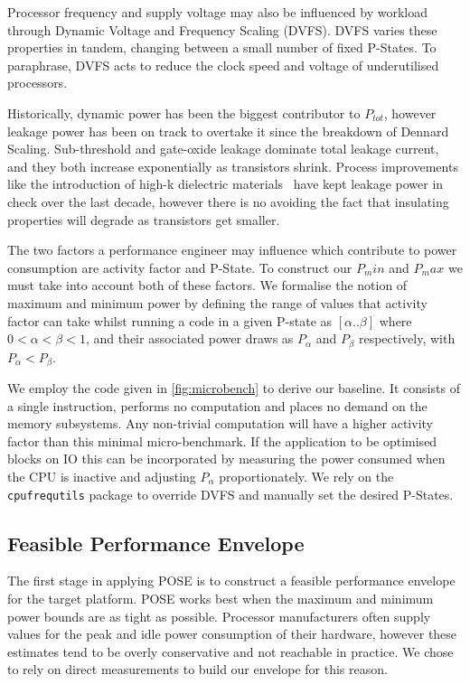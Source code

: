 Processor frequency and supply voltage may also be influenced by workload through Dynamic Voltage and Frequency Scaling (DVFS).
DVFS varies these properties in tandem, changing between a small number of fixed P-States.
To paraphrase, DVFS acts to reduce the clock speed and voltage of underutilised processors.

Historically, dynamic power has been the biggest contributor to $P_{tot}$, however leakage power has been on track to overtake it since the breakdown of Dennard Scaling.  Sub-threshold and gate-oxide leakage dominate total leakage current, and they both increase exponentially as transistors shrink. Process improvements like the introduction of high-k dielectric materials~\cite{jan:2009aa} have kept leakage power in check over the last decade, however there is no avoiding the fact that insulating properties will degrade as transistors get smaller.

The two factors a performance engineer may influence which contribute to power consumption are activity factor and P-State.
To construct our $P_min$ and $P_max$ we must take into account both of these factors.
We formalise the notion of maximum and minimum power by defining the range of values that activity factor can take whilst running a code in a given P-state as $[\alpha  .. \beta]$ where $0 < \alpha < \beta < 1$, and their associated power draws as $P_{\alpha}$ and $P_{\beta}$ respectively, with $P_{\alpha} < P_{\beta}$.

We employ the code given in \autoref{fig:microbench} to derive our baseline.  It consists of a single instruction, performs no computation and places no demand on the memory subsystems. Any non-trivial computation will have a higher activity factor than this minimal micro-benchmark. If the application to be optimised blocks on IO this can be incorporated by measuring the power consumed when the CPU is inactive and adjusting $P_\alpha$ proportionately. We rely on the \texttt{cpufrequtils} package to override DVFS and manually set the desired P-States.

\subsection{Feasible Performance Envelope}
The first stage in applying POSE is to construct a feasible performance envelope for the target platform.
POSE works best when the maximum and minimum power bounds are as tight as possible.
Processor manufacturers often supply values for the peak and idle power consumption of their hardware, however these estimates tend to be overly conservative and not reachable in practice.
We chose to rely on direct measurements to build our envelope for this reason.


